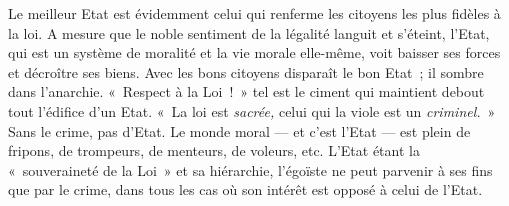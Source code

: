 \documentclass[french,twoside]{book} %
\begin{document}
\noindent Le meilleur Etat est évidemment celui qui renferme les citoyens les plus fidèles à la loi. A mesure que le noble sentiment de la légalité languit et s’éteint, l’Etat, qui est un système de moralité et la vie morale elle-même, voit baisser ses forces et décroître ses biens. Avec les bons citoyens disparaît le bon Etat ; il sombre dans l’anarchie. « Respect à la Loi ! » tel est le ciment qui maintient debout tout l’édifice d’un Etat. « La loi est \emph{sacrée,} celui qui la viole est un \emph{criminel.} » Sans le crime, pas d’Etat. Le monde moral  — et c’est l’Etat — est plein de fripons, de trompeurs, de menteurs, de voleurs, etc. L’Etat étant la « souveraineté de la Loi » et sa hiérarchie, l’égoïste ne peut parvenir à ses fins que par le crime, dans tous les cas où son intérêt est opposé à celui de l’Etat.\par
\end{document}
